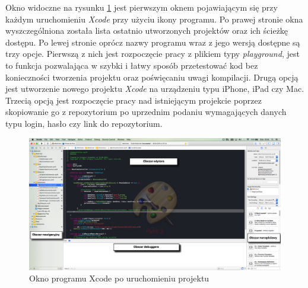 \documentclass{iiuwb}
\begin{document}
Okno widoczne na rysunku \ref{fig:XcodeOknoPowitalne} jest pierwszym oknem pojawiającym się przy każdym uruchomieniu  \textit{Xcode} przy użyciu ikony programu. Po prawej stronie okna wyszczególniona została lista ostatnio utworzonych projektów oraz ich ścieżkę dostępu. Po lewej stronie oprócz nazwy programu wraz z jego wersją dostępne są trzy opcje. Pierwszą z nich jest rozpoczęcie pracy z plikiem typy \textit{playground}, jest to funkcja pozwalająca w szybki i łatwy sposób przetestować kod bez konieczności tworzenia projektu oraz poświęcaniu uwagi kompilacji. Drugą opcją jest utworzenie nowego projektu \textit{Xcode} na urządzeniu typu iPhone, iPad czy Mac. Trzecią opcją jest rozpoczęcie pracy nad istniejącym projekcie poprzez skopiowanie go z repozytorium po uprzednim podaniu wymagających danych typu login, hasło czy link do repozytorium.

\begin{figure}[!th]
\centering
\includegraphics[scale=.3]{image/XcodeOknoProgramu.png}
\caption{Okno programu Xcode po uruchomieniu projektu}
\label{fig:XcodeOknoPowitalne}
\end{figure}
\end{document}
